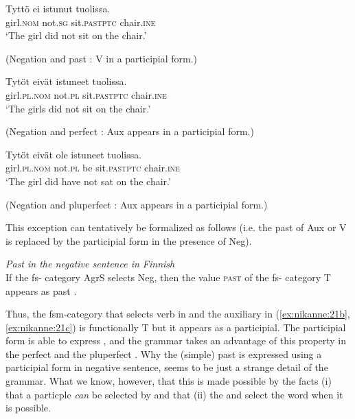 \documentclass[output=paper]{langsci/langscibook}
\begin{document}
\ea%
    \label{ex:nikanne:21}
\ea\label{ex:nikanne:21a}
\gll   Tyttö ei istunut tuolissa.            \\
girl.\textsc{nom} not.\textsc{sg} sit.\textsc{past}\textsc{ptc} chair.\textsc{ine}  \\
\glt                   ‘The girl did not sit on the chair.’    

                   (Negation and past : V in a participial form.)          

\ex\label{ex:nikanne:21b}
\gll        Tytöt eivät istuneet tuolissa.            \\
                    girl.\textsc{pl}.\textsc{nom} not.\textsc{pl} sit.\textsc{past}\textsc{ptc} chair.\textsc{ine}  \\
\glt                   ‘The girls did not sit on the chair.’    

     (Negation and perfect : Aux appears in a participial form.)

\ex\label{ex:nikanne:21c}
\gll      Tytöt eivät ole istuneet tuolissa.\\
                 girl.\textsc{pl.nom} not.\textsc{pl} be sit.\textsc{past}\textsc{ptc} chair.\textsc{ine} \\
\glt                   ‘The girl did have not sat on the chair.’    

 (Negation and pluperfect : Aux appears in a participial form.)
\z
\z


This exception can tentatively be formalized as follows (i.e. the past   of Aux or V is replaced by the participial form in the presence of Neg).

\ea
\textit{{Past  in the negative sentence in Finnish}}\\
{If the fs- category AgrS selects Neg, then the value \textsc{past} of the fs-   category T appears as past .} 
\z

Thus, the fsm-category that selects verb in  and the auxiliary in (\ref{ex:nikanne:21b}, \ref{ex:nikanne:21c}) is functionally T but it appears as a participial. The participial form is able to express , and the  grammar takes an advantage of this property in the perfect and the pluperfect . Why the (simple) past  is expressed using a participial form in negative sentence, seems to be just a strange detail of the  grammar. What we know, however, that this is made possible by the facts (i) that a particple \textit{can} be selected by  and that (ii) the  and  select the  word when it is possible.
\end{document}
